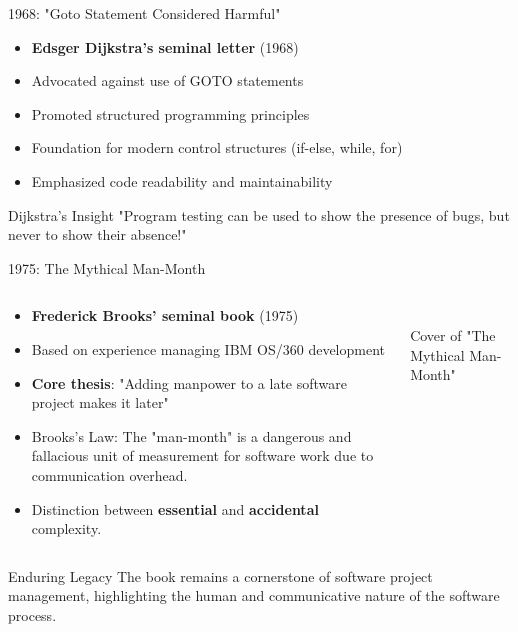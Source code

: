 \documentclass{beamer}
\begin{document}
\begin{frame}{1968: "Goto Statement Considered Harmful"}
\begin{itemize}
    \item \textbf{Edsger Dijkstra's seminal letter} (1968)
    \item Advocated against use of GOTO statements
    \item Promoted structured programming principles
    \item Foundation for modern control structures (if-else, while, for)
    \item Emphasized code readability and maintainability
\end{itemize}
\begin{block}{Dijkstra's Insight}
"Program testing can be used to show the presence of bugs, but never to show their absence!"
\end{block}
\end{frame}

\begin{frame}{1975: The Mythical Man-Month}
\begin{columns}
    \begin{column}{0.6\textwidth}
        \begin{itemize}
            \item \textbf{Frederick Brooks' seminal book} (1975)
            \item Based on experience managing IBM OS/360 development
            \item \textbf{Core thesis}: "Adding manpower to a late software project makes it later"
            \item \alert{Brooks's Law}: The "man-month" is a dangerous and fallacious unit of measurement for software work due to communication overhead.
            \item Distinction between \textbf{essential} and \textbf{accidental} complexity.
        \end{itemize}
    \end{column}
    \begin{column}{0.4\textwidth}
        \\\scriptsize{Cover of "The Mythical Man-Month"}
    \end{column}
\end{columns}
\begin{block}{Enduring Legacy}
The book remains a cornerstone of software project management, highlighting the human and communicative nature of the software process.
\end{block}
\end{frame}
\end{document}
